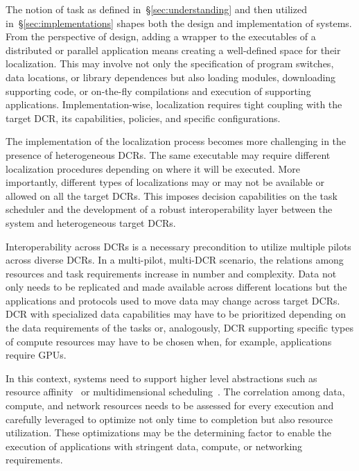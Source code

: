 \documentclass{sig-alternate}
\begin{document}
 
The notion of task as defined in~\S\ref{sec:understanding} and then utilized
in~\S\ref{sec:implementations} shapes both the design and implementation of
\pilot systems. From the perspective of design, adding a wrapper to the
executables of a distributed or parallel application means creating a
well-defined space for their localization. This may involve not only the
specification of program switches, data locations, or library dependences but
also loading modules, downloading supporting code, or on-the-fly compilations
and execution of supporting applications. Implementation-wise, localization
requires tight coupling with the target DCR, its capabilities, policies, and
specific configurations.

The implementation of the localization process becomes more challenging in the
presence of heterogeneous DCRs. The same executable may require different
localization procedures depending on where it will be executed. More
importantly, different types of localizations may or may not be available or
allowed on all the target DCRs. This imposes decision capabilities on the task
scheduler and the development of a robust interoperability layer between the
\pilot system and heterogeneous target DCRs. 


Interoperability across DCRs is a necessary precondition to utilize multiple
pilots across diverse DCRs. In a multi-pilot, multi-DCR scenario, the relations
among resources and task requirements increase in number and complexity. Data
not only needs to be replicated and made available across different locations
but the applications and protocols used to move data may change across target
DCRs. DCR with specialized data capabilities may have to be prioritized
depending on the data requirements of the tasks or, analogously, DCR supporting
specific types of compute resources may have to be chosen when, for example,
applications require GPUs.

In this context, \pilot systems need to support higher level abstractions such
as resource affinity~\cite{luckow2014pilot,neumeyer2010s4} or multidimensional
scheduling~\cite{zhu2008multi}. The correlation among data, compute, and network
resources needs to be assessed for every execution and carefully leveraged to
optimize not only time to completion but also resource utilization. These
optimizations may be the determining factor to enable the execution of
applications with stringent data, compute, or networking requirements.
\end{document}
